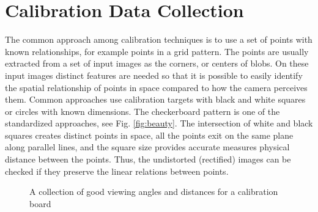 \section{Calibration Data Collection}\label{sec:calibdatacollection}
The common approach among calibration techniques is to use a set of points with known relationships, for example points in a grid pattern. The points are usually extracted from a set of input images as the corners, or centers of blobs. On these input images distinct features are needed so that it is possible to easily identify the spatial relationship of points in space compared to how the camera perceives them. Common approaches use calibration targets with black and white squares or circles with known dimensions. The checkerboard pattern is one of the standardized approaches, see Fig. \ref{fig:beauty}. The intersection of white and black squares creates distinct points in space, all the points exit on the same plane along parallel lines, and the square size provides accurate measures physical distance between the points. Thus, the undistorted (rectified) images can be checked if they preserve the linear relations between points. 

\begin{figure}[th]
	\begin{center}
	\end{center}
	\caption{A collection of good viewing angles and distances for a calibration board}
	\label{fig:goodAngles}
\end{figure}

